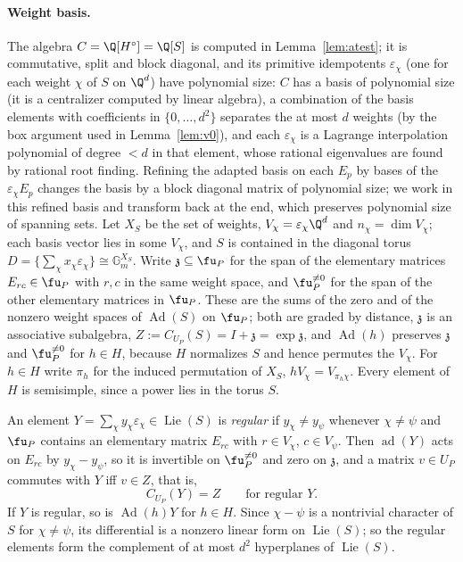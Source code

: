 \paragraph{Weight basis.} The algebra $C=\Q[H^\circ]=\Q[S]$ is computed in Lemma~\ref{lem:atest}; it
is commutative, split and block diagonal, and its primitive idempotents $\varepsilon_\chi$ (one for
each weight $\chi$ of $S$ on $\Q^d$) have polynomial size: $C$ has a basis of polynomial size (it is a
centralizer computed by linear algebra), a combination of the basis elements with coefficients in
$\{0,\ldots,d^2\}$ separates the at most $d$ weights (by the box argument used in Lemma~\ref{lem:v0}), and each
$\varepsilon_\chi$ is a Lagrange interpolation polynomial of degree $<d$ in that element, whose
rational eigenvalues are found by rational root finding. Refining the adapted basis on each $E_p$ by bases of the
$\varepsilon_\chi E_p$ changes the basis by a block diagonal matrix of polynomial size; we work in
this refined basis and transform back at the end, which preserves polynomial size of spanning sets.
Let $X_S$ be the set of weights, $V_\chi=\varepsilon_\chi\Q^d$ and $n_\chi=\dim V_\chi$; each basis
vector lies in some $V_\chi$, and $S$ is contained in the diagonal torus
$D=\{\sum_\chi x_\chi\varepsilon_\chi\}\cong\mathbb G_m^{X_S}$. Write $\mathfrak z\subseteq\fu_P$ for
the span of the elementary matrices $E_{rc}\in\fu_P$ with $r,c$ in the same weight space, and
$\fu_P^{\ne0}$ for the span of the other elementary matrices in $\fu_P$. These are the sums of the
zero and of the nonzero weight spaces of $\operatorname{Ad}(S)$ on $\fu_P$; both are graded by distance,
$\mathfrak z$ is an associative subalgebra, $Z:=C_{U_P}(S)=I+\mathfrak z=\exp\mathfrak z$, and
$\operatorname{Ad}(h)$ preserves $\mathfrak z$ and $\fu_P^{\ne0}$ for $h\in H$, because $H$ normalizes $S$ and
hence permutes the $V_\chi$. For $h\in H$ write $\pi_h$ for the induced permutation of $X_S$,
$hV_\chi=V_{\pi_h\chi}$. Every element of $H$ is semisimple, since a power lies in the torus $S$.

An element $Y=\sum_\chi y_\chi\varepsilon_\chi\in\operatorname{Lie}(S)$ is \emph{regular} if
$y_\chi\ne y_\psi$ whenever $\chi\ne\psi$ and $\fu_P$ contains an elementary matrix $E_{rc}$ with
$r\in V_\chi$, $c\in V_\psi$. Then $\operatorname{ad}(Y)$ acts on $E_{rc}$ by $y_\chi-y_\psi$, so it is invertible on
$\fu_P^{\ne0}$ and zero on $\mathfrak z$, and a matrix $v\in U_P$ commutes with $Y$ iff $v\in Z$, that is,
\begin{equation}\label{eq:regcent}
C_{U_P}(Y)=Z\qquad\text{for regular }Y.
\end{equation}
If $Y$ is regular, so is $\operatorname{Ad}(h)Y$ for $h\in H$. Since $\chi-\psi$ is a nontrivial character of
$S$ for $\chi\ne\psi$, its differential is a nonzero linear form on $\operatorname{Lie}(S)$; so the regular elements
form the complement of at most $d^2$ hyperplanes of $\operatorname{Lie}(S)$.

